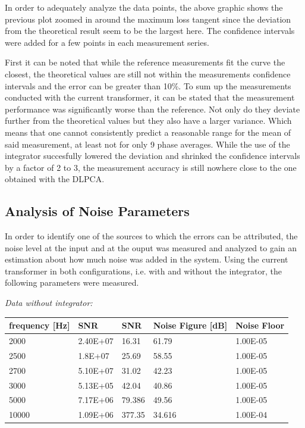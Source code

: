 In order to adequately analyze the data points, the above graphic shows the previous plot
zoomed in around the maximum loss tangent since the deviation from the theoretical result seem to be the largest here.
The confidence intervals were added for a few points in each measurement series.

First it can be noted that while the reference measurements fit the curve the closest, the theoretical values are still not
within the measurements confidence intervals and the error can be greater than 10\%. To sum up the measurements conducted with
the current transformer, it can be stated that the measurement performance was significantly worse than the reference. Not only do they deviate further from the theoretical values
but they also have a larger variance. Which means that one cannot consistently predict a reasonable range for the mean of said measurement, at least not for only 9 phase averages.
While the use of the integrator succesfully lowered the deviation and shrinked the confidence intervals by a factor of 2 to 3, the measurement accuracy is still nowhere close to the one obtained with the DLPCA.

\subsection{Analysis of Noise Parameters}

In order to identify one of the sources to which the errors can be attributed, the noise level at the input and at the ouput was measured and analyzed to gain an estimation about how much noise was added in the system.
Using the current transformer in both configurations, i.e. with and without the integrator, the following parameters were measured. 

\newpage

\textit{Data without integrator:}
\begin{center}
\begin{tabular}{|m{3cm}|m{3cm}|m{1cm}|m{4cm}|m{2cm}|} 
\hline
frequency [Hz]& SNR & SNR & Noise Figure [dB] & Noise Floor \\ 
\hline \hline
2000 & 2.40E+07 & 16.31 & \cellcolor{blue!25}61.79 & 1.00E-05 \\ 
\hline
2500 & 1.8E+07 & 25.69 & \cellcolor{blue!25}58.55 & 1.00E-05 \\ 
\hline
2700 & 5.10E+07 & 31.02 & \cellcolor{blue!25}42.23 & 1.00E-05 \\ 
\hline
3000 & 5.13E+05 & 42.04 & \cellcolor{blue!25}40.86 & 1.00E-05 \\ 
\hline
5000 & 7.17E+06 & 79.386 & \cellcolor{red!25}49.56 & 1.00E-05 \\ 
\hline
10000 & 1.09E+06 & 377.35 & \cellcolor{red!25}34.616 & 1.00E-04 \\ 
\hline

\end{tabular}
\end{center}


